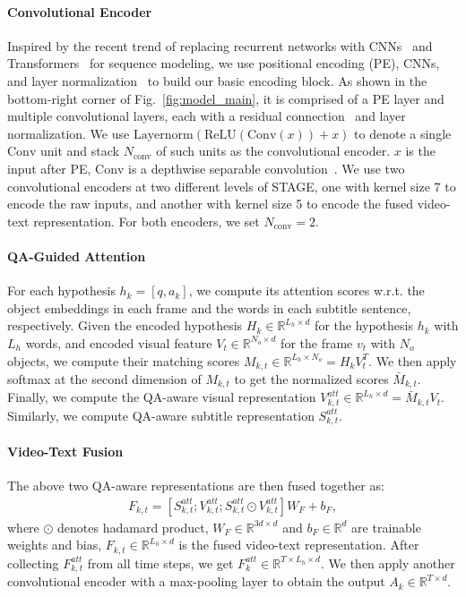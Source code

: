 \documentclass[11pt,a4paper]{article}
\begin{document}
\paragraph{Convolutional Encoder}\label{sec:conv_enc}
Inspired by the recent trend of replacing recurrent networks with CNNs~\cite{Dauphin2016LanguageMW,Yu2018QANetCL} and Transformers~\cite{Vaswani2017AttentionIA,Devlin2018BERTPO} for sequence modeling, we use positional encoding (PE), CNNs, and layer normalization~\cite{Ba2016LayerN} to build our basic encoding block. 
As shown in the bottom-right corner of Fig.~\ref{fig:model_main}, it is comprised of a PE layer and multiple convolutional layers, each with a residual connection~\cite{He2016DeepRL} and layer normalization. 
We use $\mathrm{Layernorm}(\mathrm{ReLU}(\mathrm{Conv}(x)) + x)$ to denote a single $\mathrm{Conv}$ unit and stack $N_\mathrm{conv}$ of such units as the convolutional encoder. $x$ is the input after PE, $\mathrm{Conv}$ is a depthwise separable convolution~\cite{Chollet2017XceptionDL}.
We use two convolutional encoders at two different levels of STAGE, one with kernel size 7 to encode the raw inputs, and another with kernel size 5 to encode the fused video-text representation. 
For both encoders, we set $N_\mathrm{conv} =2$.


\paragraph{QA-Guided Attention} 
For each hypothesis $h_{k} = [q, a_k]$, we compute its attention scores w.r.t. the object embeddings in each frame and the words in each subtitle sentence, respectively. 
Given the encoded hypothesis $H_k \in \mathbb{R}^{L_h \times d}$ for the hypothesis $h_k$ with $L_h$ words, and encoded visual feature $V_t \in \mathbb{R}^{N_o \times d}$ for the frame $v_t$ with $N_o$ objects, we compute their matching scores $M_{k, t} \in \mathbb{R}^{L_h \times N_o} = H_k V_t^T$. 
We then apply softmax at the second dimension of $M_{k, t}$ to get the normalized scores $\bar{M}_{k, t}$. 
Finally, we compute the QA-aware visual representation $V_{k, t}^{att} \in \mathbb{R}^{L_h \times d} = \bar{M}_{k, t} V_t$. 
Similarly, we compute QA-aware subtitle representation $S_{k, t}^{att}$. 

\paragraph{Video-Text Fusion} 
The above two QA-aware representations are then fused together as:
\begin{align*}
    F_{k, t} = [S_{k, t}^{att}; V_{k, t}^{att}; S_{k, t}^{att} \odot V_{k, t}^{att}]W_F + b_F,
\end{align*}
where $\odot$ denotes hadamard product, $W_F \in \mathbb{R}^{3d \times d}$ and $b_F \in \mathbb{R}^{d}$ are trainable weights and bias, $F_{k, t} \in \mathbb{R}^{L_h \times d}$ is the fused video-text representation. 
After collecting $F_{k, t}^{att}$ from all time steps, we get $F_{k}^{att} \in \mathbb{R}^{T \times  L_h \times d}$. 
We then apply another convolutional encoder with a max-pooling layer to obtain the output $A_{k} \in \mathbb{R}^{T \times d}$.
\end{document}
